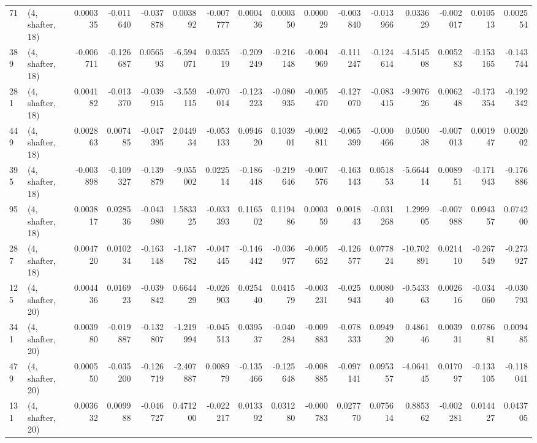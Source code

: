 \begin{tabular}{llrrrrrrrrrrrrrr}
71  &  (4, shafter, 18) &   0.000335 & -0.011640 & -0.037878 &    0.003892 & -0.007777 &   0.000436 &  0.000350 &  0.000029 & -0.003840 & -0.013966 &     0.033629 & -0.002017 &  0.010513 &  0.002554 \\
389 &  (4, shafter, 18) &  -0.006711 & -0.126687 &  0.056593 &   -6.594071 &  0.035519 &  -0.209249 & -0.216148 & -0.004969 & -0.111247 & -0.124614 &    -4.514508 &  0.005283 & -0.153165 & -0.143744 \\
281 &  (4, shafter, 18) &   0.004182 & -0.013370 & -0.039915 &   -3.559115 & -0.070014 &  -0.123223 & -0.080935 & -0.005470 & -0.127070 & -0.083415 &    -9.907626 &  0.006248 & -0.173354 & -0.192342 \\
449 &  (4, shafter, 18) &   0.002863 &  0.007485 & -0.047395 &    2.044934 & -0.053133 &   0.094620 &  0.103901 & -0.002811 & -0.065399 & -0.000466 &     0.050038 & -0.007013 &  0.001947 &  0.002002 \\
395 &  (4, shafter, 18) &  -0.003898 & -0.109327 & -0.139879 &   -9.055002 &  0.022514 &  -0.186448 & -0.219646 & -0.007576 & -0.163143 &  0.051853 &    -5.664414 &  0.008951 & -0.171943 & -0.176886 \\
95  &  (4, shafter, 18) &   0.003817 &  0.028536 & -0.043980 &    1.583325 & -0.033393 &   0.116502 &  0.119486 &  0.000359 &  0.001843 & -0.031268 &     1.299905 & -0.007988 &  0.094357 &  0.074200 \\
287 &  (4, shafter, 18) &   0.004720 &  0.010234 & -0.163148 &   -1.187782 & -0.047445 &  -0.146442 & -0.036977 & -0.005652 & -0.126577 &  0.077824 &   -10.702891 &  0.021410 & -0.267549 & -0.273927 \\
125 &  (4, shafter, 20) &   0.004436 &  0.016923 & -0.039842 &    0.664429 & -0.026903 &   0.025440 &  0.041579 & -0.003231 & -0.025943 &  0.008040 &    -0.543363 &  0.002616 & -0.034060 & -0.030793 \\
341 &  (4, shafter, 20) &   0.003980 & -0.019887 & -0.132807 &   -1.219994 & -0.045513 &   0.039537 & -0.040284 & -0.009883 & -0.078333 &  0.094920 &     0.486146 &  0.003931 &  0.078681 &  0.009485 \\
479 &  (4, shafter, 20) &   0.000550 & -0.035200 & -0.126719 &   -2.407887 &  0.008979 &  -0.135466 & -0.125648 & -0.008885 & -0.097141 &  0.095357 &    -4.064145 &  0.017097 & -0.133105 & -0.118041 \\
131 &  (4, shafter, 20) &   0.003632 &  0.009988 & -0.046727 &    0.471200 & -0.022217 &   0.013392 &  0.031280 & -0.000783 &  0.027770 &  0.075614 &     0.885362 & -0.002281 &  0.014427 &  0.043705 \\

\end{tabular}
